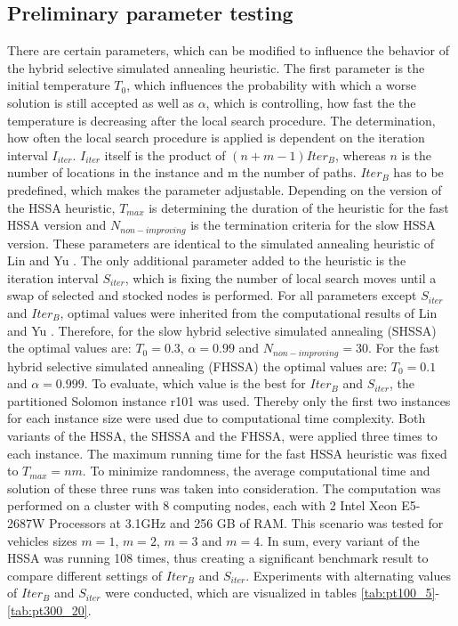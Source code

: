 \documentclass[final,5p,times,twocolumn]{elsarticle}
\begin{document}
{{{\subsection{Preliminary parameter testing}
There are certain parameters, which can be modified to influence the behavior of the hybrid selective simulated annealing heuristic. The first parameter is the initial temperature $T_{0}$, which influences the probability with which a worse solution is still accepted as well as $\alpha$, which is controlling, how fast the the temperature is decreasing after the local search procedure. The determination, how often the local search procedure is applied is dependent on the iteration interval $I_{iter}$. $I_{iter}$ itself is the product of $(n+m-1)Iter_{B}$, whereas $n$ is the number of locations in the instance and m the number of paths. $Iter_{B}$ has to be predefined, which makes the parameter adjustable. Depending on the version of the HSSA heuristic, $T_{max}$ is determining the duration of the heuristic for the fast HSSA version and $N_{non-improving}$ is the termination criteria for the slow HSSA version. These parameters are identical to the simulated annealing heuristic of Lin and Yu \cite{Lin:2012sa}. The only additional parameter added to the heuristic is the iteration interval $S_{iter}$, which is fixing the number of local search moves until a swap of selected and stocked nodes is performed. For all parameters except $S_{iter}$ and $Iter_{B}$, optimal values were inherited from the computational results of Lin and Yu \cite{Lin:2012sa}. Therefore, for the slow hybrid selective simulated annealing (SHSSA) the optimal values are: $T_{0}=0.3$, $\alpha = 0.99$ and $N_{non-improving}=30$.  For the fast hybrid selective simulated annealing (FHSSA) the optimal values are: $T_{0}=0.1$ and $\alpha = 0.999$. 
To evaluate, which value is the best for $Iter_{B}$ and $S_{iter}$, the partitioned Solomon instance r101 was used. Thereby only the first two instances for each instance size were used due to computational time complexity. Both variants of the HSSA, the SHSSA and the FHSSA, were applied three times to each instance. The maximum running time for the fast HSSA heuristic was fixed to $T_{max}=nm$. To minimize randomness, the average computational time and solution of these three runs was taken into consideration. The computation was performed on a cluster with 8 computing nodes, each with 2 Intel Xeon E5-2687W Processors at 3.1GHz and 256 GB of RAM. This scenario was tested for vehicles sizes $m=1$, $m=2$, $m=3$ and $m=4$. In sum, every variant of the HSSA was running 108 times, thus creating a significant benchmark result to compare different settings of $Iter_{B}$ and $S_{iter}$. Experiments with alternating values of $Iter_{B}$ and $S_{iter}$ were conducted, which are visualized in tables \ref{tab:pt100_5}-\ref{tab:pt300_20}.\\

}}}
\end{document}
